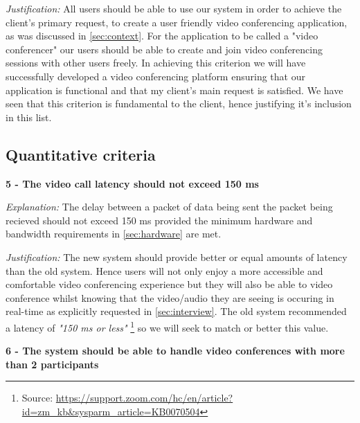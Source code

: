 \vspace{0.1cm}

\textit{Justification:}
All users should be able to use our system in order to 
achieve the client's primary request, to create a user
friendly video conferencing application, as was discussed
in \ref{sec:context}. For the application to be called a 
"video conferencer" our users should be able to create and
join video conferencing sessions with other users freely.
In achieving this criterion we will have successfully 
developed a video conferencing platform ensuring that our 
application is functional and that my client's main request
is satisfied. We have seen that this criterion is fundamental
to the client, hence justifying it's inclusion in this list.\\

\subsection{Quantitative criteria}

\textsf{\bfseries 5 - The video call latency should not exceed 150 ms}

\vspace{0.1cm}

\textit{Explanation:}
The delay between a packet of data being sent the packet 
being recieved should not exceed 150 ms provided the minimum
hardware and bandwidth requirements in \ref{sec:hardware} 
are met.

\vspace{0.1cm}

\textit{Justification:}
The new system should provide better or equal amounts of 
latency than the old system. Hence users will not only enjoy
a more accessible and comfortable video conferencing 
experience but they will also be able to video conference 
whilst knowing that the video/audio they are seeing is
occuring in real-time as explicitly requested in 
\ref{sec:interview}. The old system recommended a latency of
\textit{"150 ms or less"} \footnote{Source:
\url{https://support.zoom.com/hc/en/article?id=zm_kb&sysparm_article=KB0070504}} 
so we will seek to match or better this value.

\vspace{0.2cm}

\textsf{\bfseries 6 - The system should be able to handle video 
conferences with more than 2 participants}

\vspace{0.1cm}

